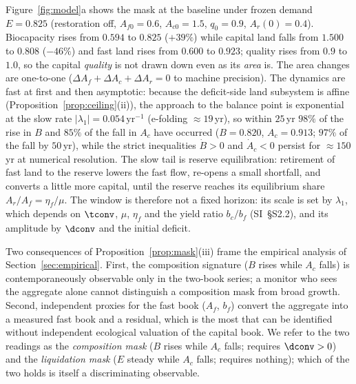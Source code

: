 Figure~\ref{fig:model}a shows the mask at the baseline under frozen demand $E=0.825$ (restoration off, $A_{f0}=0.6$, $A_{c0}=1.5$, $q_0=0.9$, $A_r(0)=0.4$). Biocapacity rises from $0.594$ to $0.825$ ($+39\%$) while capital land falls from $1.500$ to $0.808$ ($-46\%$) and fast land rises from $0.600$ to $0.923$; quality rises from $0.9$ to $1.0$, so the capital \emph{quality} is not drawn down even as its \emph{area} is. The area changes are one-to-one ($\Delta A_f+\Delta A_c+\Delta A_r=0$ to machine precision). The dynamics are fast at first and then asymptotic: because the deficit-side land subsystem is affine (Proposition~\ref{prop:ceiling}(ii)), the approach to the balance point is exponential at the slow rate $|\lambda_1|=0.054\,\mathrm{yr}^{-1}$ (e-folding $\approx19$\,yr), so within $25$\,yr $98\%$ of the rise in $B$ and $85\%$ of the fall in $A_c$ have occurred ($B=0.820$, $A_c=0.913$; $97\%$ of the fall by $50$\,yr), while the strict inequalities $\dot B>0$ and $\dot A_c<0$ persist for $\approx150$\,yr at numerical resolution. The slow tail is reserve equilibration: retirement of fast land to the reserve lowers the fast flow, re-opens a small shortfall, and converts a little more capital, until the reserve reaches its equilibrium share $A_r/A_f=\eta_f/\mu$. The window is therefore not a fixed horizon: its scale is set by $\lambda_1$, which depends on $\tconv$, $\mu$, $\eta_f$ and the yield ratio $b_c/b_f$ (SI~\S S2.2), and its amplitude by $\dconv$ and the initial deficit.

Two consequences of Proposition~\ref{prop:mask}(iii) frame the empirical analysis of Section~\ref{sec:empirical}. First, the composition signature ($B$ rises while $A_c$ falls) is contemporaneously observable only in the two-book series; a monitor who sees the aggregate alone cannot distinguish a composition mask from broad growth. Second, independent proxies for the fast book ($A_f$, $b_f$) convert the aggregate into a measured fast book and a residual, which is the most that can be identified without independent ecological valuation of the capital book. We refer to the two readings as the \emph{composition mask} ($B$ rises while $A_c$ falls; requires $\dconv>0$) and the \emph{liquidation mask} ($E$ steady while $A_c$ falls; requires nothing); which of the two holds is itself a discriminating observable.

